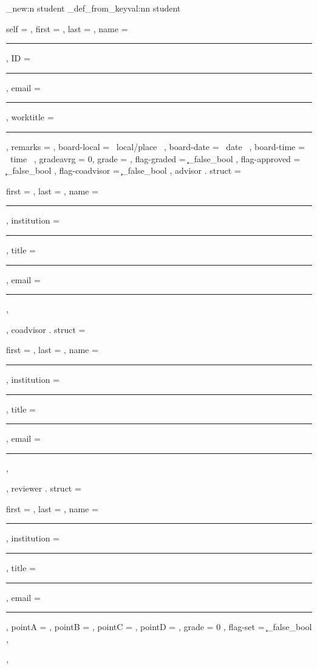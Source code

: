 \documentclass[10pt]{article}
\begin{document}
\begin{codestore}
\starray_new:n {student}
\starray_def_from_keyval:nn {student} {
  self = , %
  first = ,
  last = ,
  name = \rule{\l__stdemo_name_rule_dim}{.1pt} ,
  ID    = \rule{\l__stdemo_ID_rule_dim}{.1pt} , 
  email = \rule{\l__stdemo_email_rule_dim}{.1pt} ,
  worktitle = \rule{\l__stdemo_worktitle_rule_dim}{.1pt} ,
  remarks = ,
  board-local = {~local/place~} ,
  board-date   = {~date~} ,
  board-time  = {~time~} ,
  gradeavrg = 0,
  grade = ,
  flag-graded = \c_false_bool , %
  flag-approved = \c_false_bool ,
  flag-coadvisor = \c_false_bool ,
  advisor . struct = {
    first = ,
    last =  ,
    name = \rule{\l__stdemo_name_rule_dim}{.1pt},
    institution = \rule{\l__stdemo_name_rule_dim}{.1pt},
    title = \rule{\l__stdemo_title_rule_dim}{.1pt} ,
    email = \rule{\l__stdemo_email_rule_dim}{.1pt} ,
  } ,
  coadvisor . struct = {
    first = ,
    last =  ,
    name = \rule{\l__stdemo_name_rule_dim}{.1pt},
    institution = \rule{\l__stdemo_name_rule_dim}{.1pt},
    title = \rule{\l__stdemo_title_rule_dim}{.1pt} ,
    email = \rule{\l__stdemo_email_rule_dim}{.1pt} ,
  } ,
  reviewer . struct = {
    first = ,
    last =  ,
    name = \rule{\l__stdemo_name_rule_dim}{.1pt},
    institution = \rule{\l__stdemo_name_rule_dim}{.1pt},
    title = \rule{\l__stdemo_title_rule_dim}{.1pt} ,
    email = \rule{\l__stdemo_email_rule_dim}{.1pt} ,
    pointA = ,
    pointB = ,
    pointC = ,
    pointD = ,
    grade = 0 ,
    flag-set = \c_false_bool , 
  } ,
 }
\end{codestore}

\begin{codestore}[DataRecovery]
\end{codestore}



\begin{codestore}[DataRecovery]
\end{codestore}

\begin{codestore}[DataRecovery]
\end{codestore}
\end{document}

